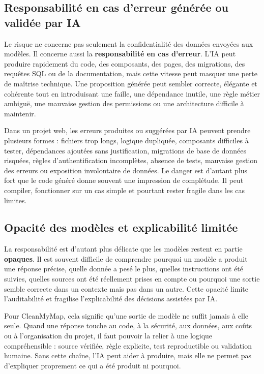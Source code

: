 \documentclass[
  10pt,
  a4paper,
  DIV=11,
  numbers=noendperiod,
  oneside]{scrreprt}
\let\oldtextbf\textbf
\renewcommand{\textbf}[1]{\oldtextbf{\textcolor{cmmnavy}{#1}}}
\begin{document}
\subsection{Responsabilité en cas d'erreur générée ou validée par
IA}\label{responsabilituxe9-en-cas-derreur-guxe9nuxe9ruxe9e-ou-validuxe9e-par-ia}

Le risque ne concerne pas seulement la confidentialité des données
envoyées aux modèles. Il concerne aussi la \textbf{responsabilité en cas
d'erreur}. L'IA peut produire rapidement du code, des composants, des
pages, des migrations, des requêtes SQL ou de la documentation, mais
cette vitesse peut masquer une perte de maîtrise technique. Une
proposition générée peut sembler correcte, élégante et cohérente tout en
introduisant une faille, une dépendance inutile, une règle métier
ambiguë, une mauvaise gestion des permissions ou une architecture
difficile à maintenir.

Dans un projet web, les erreurs produites ou suggérées par IA peuvent
prendre plusieurs formes : fichiers trop longs, logique dupliquée,
composants difficiles à tester, dépendances ajoutées sans justification,
migrations de base de données risquées, règles d'authentification
incomplètes, absence de tests, mauvaise gestion des erreurs ou
exposition involontaire de données. Le danger est d'autant plus fort que
le code généré donne souvent une impression de complétude. Il peut
compiler, fonctionner sur un cas simple et pourtant rester fragile dans
les cas limites.

\subsection{Opacité des modèles et explicabilité
limitée}\label{opacituxe9-des-moduxe8les-et-explicabilituxe9-limituxe9e}

La responsabilité est d'autant plus délicate que les modèles restent en
partie \textbf{opaques}. Il est souvent difficile de comprendre pourquoi
un modèle a produit une réponse précise, quelle donnée a pesé le plus,
quelles instructions ont été suivies, quelles sources ont été réellement
prises en compte ou pourquoi une sortie semble correcte dans un contexte
mais pas dans un autre. Cette opacité limite l'auditabilité et fragilise
l'explicabilité des décisions assistées par IA.

Pour CleanMyMap, cela signifie qu'une sortie de modèle ne suffit jamais
à elle seule. Quand une réponse touche au code, à la sécurité, aux
données, aux coûts ou à l'organisation du projet, il faut pouvoir la
relier à une logique compréhensible : source vérifiée, règle explicite,
test reproductible ou validation humaine. Sans cette chaîne, l'IA peut
aider à produire, mais elle ne permet pas d'expliquer proprement ce qui
a été produit ni pourquoi.
\end{document}
